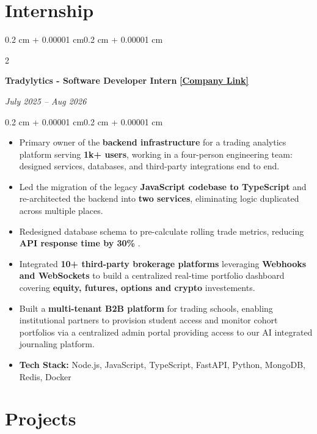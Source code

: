 \documentclass[10pt, letterpaper]{article}
\newenvironment{highlights}{
    \begin{itemize}[
        topsep=0.06 cm,
        parsep=0.06 cm,
        partopsep=0pt,
        itemsep=0pt,
        leftmargin=0.4 cm + 10pt
    ]
}{
    \end{itemize}
}
\newenvironment{onecolentry}{
    \begin{adjustwidth}{0.2 cm + 0.00001 cm}{0.2 cm + 0.00001 cm}
}{
    \end{adjustwidth}
}
\newenvironment{twocolentry}[2][]{
    \onecolentry
    \def\secondColumn{#2}
    \setcolumnwidth{\fill, 4.5 cm}
    \begin{paracol}{2}
}{
    \switchcolumn \raggedleft \secondColumn
    \end{paracol}
    \endonecolentry
}
\let\hrefWithoutArrow\href
\renewcommand{\href}[2]{\hrefWithoutArrow{#1}{\ifthenelse{\equal{#2}{}}{ }{#2 }\raisebox{.15ex}{\footnotesize \faExternalLink*}}}
\begin{document}
\section{Internship}
    \begin{twocolentry}{   
        \textit{July 2025 -- Aug 2026}}
            \textbf{Tradylytics - Software Developer Intern}
            \quad
            \hrefWithoutArrow{https://www.tradylytics.in/}{\textbf{[Company Link]}}
    \end{twocolentry}   
    \vspace{0.10 cm}
    \begin{onecolentry}
        \begin{highlights}
            \item Primary owner of the \textbf{backend infrastructure} for a trading analytics platform serving \textbf{1k+ users}, working in a four-person 
                engineering team: designed services, databases, and third-party integrations end to end.
            \item Led the migration of the legacy \textbf{JavaScript codebase to TypeScript} and re-architected the backend into \textbf{two services}, 
                eliminating logic duplicated across multiple places.
            \item Redesigned database schema to pre-calculate rolling trade metrics, reducing \textbf{API response time by 30\% }.
            \item Integrated \textbf{10+ third-party brokerage platforms} leveraging \textbf{Webhooks and WebSockets} to build a centralized real-time portfolio 
                dashboard covering \textbf{equity, futures, options and crypto} investements.
            \item Built a \textbf{multi-tenant B2B platform} for trading schools, enabling institutional partners to provision student access and monitor cohort 
                portfolios via a centralized admin portal providing access to our AI integrated journaling platform.
            \item \textbf{Tech Stack:} Node.js, JavaScript, TypeScript, FastAPI, Python, MongoDB, Redis, Docker
        \end{highlights}
    \end{onecolentry}
\vspace{0.1 cm}
    


\section{Projects}
\end{document}
